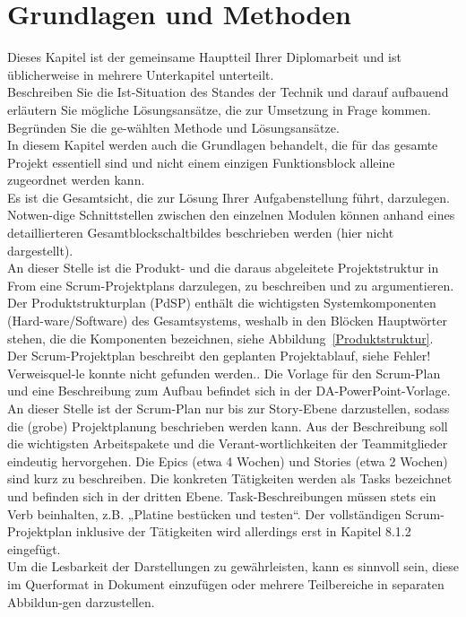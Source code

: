 \documentclass[12pt]{article}
\begin{document}
\section{Grundlagen und Methoden}
\color{blue}
Dieses Kapitel ist der gemeinsame Hauptteil Ihrer Diplomarbeit und ist üblicherweise in mehrere Unterkapitel unterteilt.\\
Beschreiben Sie die Ist-Situation des Standes der Technik und darauf aufbauend erläutern Sie mögliche Lösungsansätze, die zur Umsetzung in Frage kommen. Begründen Sie die ge-wählten Methode und Lösungsansätze.\\
In diesem Kapitel werden auch die Grundlagen behandelt, die für das gesamte Projekt essentiell sind und nicht einem einzigen Funktionsblock alleine zugeordnet werden kann.\\
Es ist die Gesamtsicht, die zur Lösung Ihrer Aufgabenstellung führt, darzulegen. Notwen-dige Schnittstellen zwischen den einzelnen Modulen können anhand eines detaillierteren Gesamtblockschaltbildes beschrieben werden (hier nicht dargestellt). \\
An dieser Stelle ist die Produkt- und die daraus abgeleitete Projektstruktur in From eine Scrum-Projektplans darzulegen, zu beschreiben und zu argumentieren.\\
Der Produktstrukturplan (PdSP) enthält die wichtigsten Systemkomponenten (Hard-ware/Software) des Gesamtsystems, weshalb in den Blöcken Hauptwörter stehen, die die Komponenten bezeichnen, siehe Abbildung~\ref{Produktstruktur}. \\
Der Scrum-Projektplan beschreibt den geplanten Projektablauf, siehe Fehler! Verweisquel-le konnte nicht gefunden werden..  Die Vorlage für den Scrum-Plan und eine Beschreibung zum Aufbau befindet sich in der DA-PowerPoint-Vorlage. An dieser Stelle ist der Scrum-Plan nur bis zur Story-Ebene darzustellen, sodass die (grobe) Projektplanung beschrieben werden kann. Aus der Beschreibung soll die wichtigsten Arbeitspakete und die Verant-wortlichkeiten der Teammitglieder eindeutig hervorgehen. Die Epics (etwa 4 Wochen) und Stories (etwa 2 Wochen) sind kurz zu beschreiben. Die konkreten Tätigkeiten werden als Tasks bezeichnet und befinden sich in der dritten Ebene. Task-Beschreibungen müssen stets ein Verb beinhalten, z.B. „Platine bestücken und testen“. Der vollständigen Scrum-Projektplan inklusive der Tätigkeiten wird allerdings erst in Kapitel 8.1.2 eingefügt.\\
Um die Lesbarkeit der Darstellungen zu gewährleisten, kann es sinnvoll sein, diese im Querformat in Dokument einzufügen oder mehrere Teilbereiche in separaten Abbildun-gen darzustellen.\\
\end{document}
